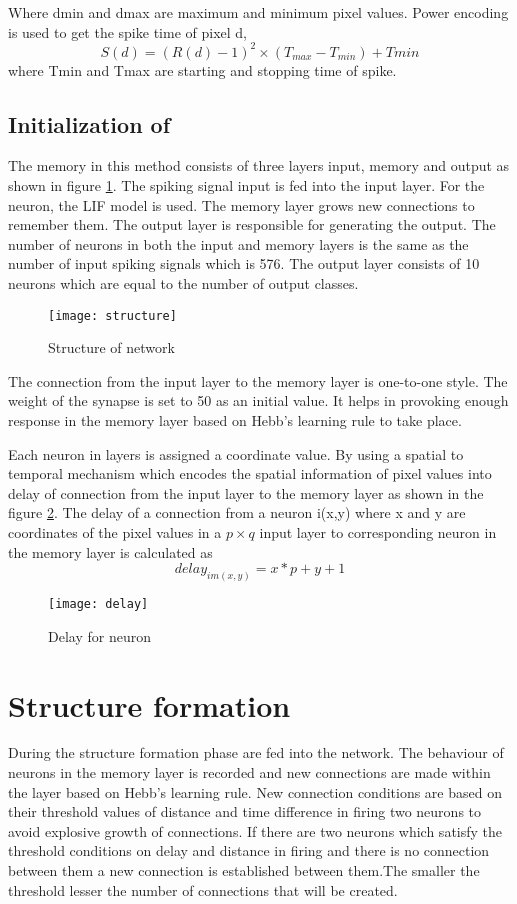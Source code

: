 Where d{min} and d{max} are maximum and minimum pixel values. Power encoding is
used to get the spike time of pixel d,
\begin{equation*}
    S(d)=(R(d)-1)^2 \times (T_{max}-T_{min})+T{min}
\end{equation*}
where T{min} and T{max} are starting and stopping time of spike.
\subsection{Initialization of \Snn}
The memory \nn in this method consists of three layers input, memory and output
as shown in figure \ref{structure}. The spiking signal input is fed into the
input layer. For the neuron, the LIF model is used. The memory layer grows new
connections to remember them. The output layer is responsible for generating
the output. The number of neurons in both the input and memory layers is the
same as the number of input spiking signals which is 576. The output layer
consists of 10 neurons which are equal to the number of output classes.
\begin{figure}[h!]
    \centering
    \texttt{[image: structure]}
    \caption{Structure of network}
    \label{structure}
\end{figure}

The connection from the input layer to the memory layer is one-to-one style.
The weight of the synapse is set to 50 as an initial value. It helps in
provoking enough response in the memory layer based on Hebb's learning
rule\cite{hebbs} to take place.

Each neuron in layers is assigned a coordinate value. By using a spatial to
temporal mechanism which encodes the spatial information of pixel values into
delay of connection from the input layer to the memory layer as shown in the
figure \ref{delay}. The delay of a connection from a neuron i(x,y) where x and
y are coordinates of the pixel values in a $p \times q$ input layer to
corresponding neuron in the memory layer is calculated as
\begin{equation*}
    delay_{im(x,y)}=x*p+y+1
\end{equation*}
\begin{figure}[h!]
    \centering
    \texttt{[image: delay]}
    \caption{Delay for neuron}
    \label{delay}
\end{figure}
\section{Structure formation}
During the structure formation phase are fed into the network. The behaviour of
neurons in the memory layer is recorded and new connections are made within the
layer based on Hebb's learning rule\cite{hebbs}. New connection conditions are
based on their threshold values of distance and time difference in firing two
neurons to avoid explosive growth of connections. If there are two neurons
which satisfy the threshold conditions on delay and distance in firing and
there is no connection between them a new connection is established between
them.The smaller the threshold lesser the number of connections that will be
created.

